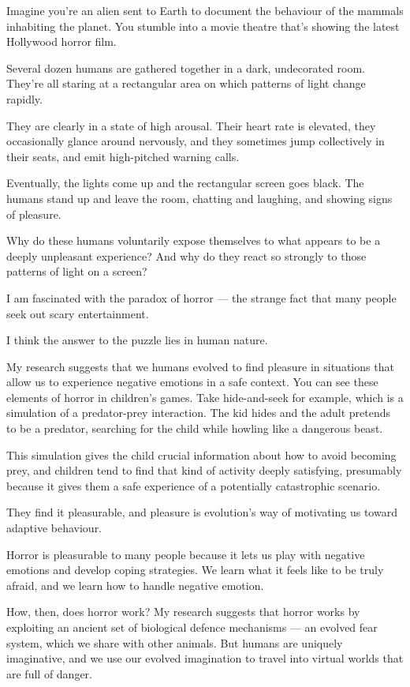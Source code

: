\documentclass[UTF8,11pt]{ctexart}
\begin{document}
Imagine you’re an alien sent to Earth to document the behaviour of the mammals inhabiting the planet. You stumble into a movie theatre that’s showing the latest Hollywood horror film.


Several dozen humans are gathered together in a dark, undecorated room. They’re all staring at a rectangular area on which patterns of light change rapidly.


They are clearly in a state of high arousal. Their heart rate is elevated, they occasionally glance around nervously, and they sometimes jump collectively in their seats, and emit high-pitched warning calls.


Eventually, the lights come up and the rectangular screen goes black. The humans stand up and leave the room, chatting and laughing, and showing signs of pleasure.


Why do these humans voluntarily expose themselves to what appears to be a deeply unpleasant experience? And why do they react so strongly to those patterns of light on a screen?


I am fascinated with the paradox of horror — the strange fact that many people seek out scary entertainment.


I think the answer to the puzzle lies in human nature.


My research suggests that we humans evolved to find pleasure in situations that allow us to experience negative emotions in a safe context. You can see these elements of horror in children’s games. Take hide-and-seek for example, which is a simulation of a predator-prey interaction. The kid hides and the adult pretends to be a predator, searching for the child while howling like a dangerous beast.


This simulation gives the child crucial information about how to avoid becoming prey, and children tend to find that kind of activity deeply satisfying, presumably because it gives them a safe experience of a potentially catastrophic scenario.


They find it pleasurable, and pleasure is evolution’s way of motivating us toward adaptive behaviour.


Horror is pleasurable to many people because it lets us play with negative emotions and develop coping strategies. We learn what it feels like to be truly afraid, and we learn how to handle negative emotion.


How, then, does horror work? My research suggests that horror works by exploiting an ancient set of biological defence mechanisms — an evolved fear system, which we share with other animals. But humans are uniquely imaginative, and we use our evolved imagination to travel into virtual worlds that are full of danger.
\end{document}
